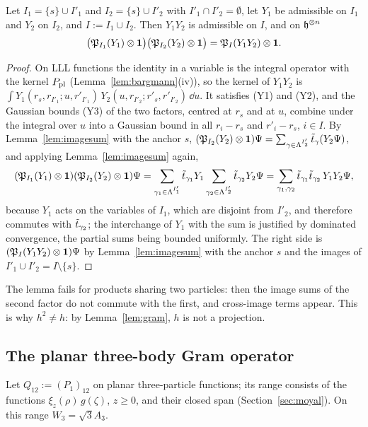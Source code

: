 \begin{lemma}\label{lem:product}
Let $I_1=\{s\}\cup I'_1$ and $I_2=\{s\}\cup I'_2$ with $I'_1\cap I'_2=\emptyset$, let $Y_1$ be admissible on $I_1$ and $Y_2$ on $I_2$, and
$I:=I_1\cup I_2$. Then $Y_1Y_2$ is admissible on $I$, and on $\mathfrak{h}^{\otimes n}$
\[
\bigl(\mathfrak{P}_{I_1}(Y_1)\otimes\mathbf{1}\bigr)\bigl(\mathfrak{P}_{I_2}(Y_2)\otimes\mathbf{1}\bigr)=\mathfrak{P}_I(Y_1Y_2)\otimes\mathbf{1} .
\]
\end{lemma}

\begin{proof}
On LLL functions the identity in a variable is the integral operator with the kernel $P_{\mathrm{pl}}$ (Lemma~\ref{lem:bargmann}(iv)), so the
kernel of $Y_1Y_2$ is $\int Y_1(r_s,r_{I'_1};u,r'_{I'_1})\,Y_2(u,r_{I'_2};r'_s,r'_{I'_2})\,\dd u$. It satisfies (Y1) and (Y2), and the Gaussian
bounds (Y3) of the two factors, centred at $r_s$ and at $u$, combine under the integral over $u$ into a Gaussian bound in all
$r_i-r_s$ and $r'_i-r_s$, $i\in I$. By Lemma~\ref{lem:imagesum} with the anchor $s$,
$(\mathfrak{P}_{I_2}(Y_2)\otimes\mathbf{1})\Psi=\sum_{\gamma\in\Lambda^{I'_2}}\tilde t_\gamma(Y_2\Psi)$, and applying Lemma~\ref{lem:imagesum} again,
\[
(\mathfrak{P}_{I_1}(Y_1)\otimes\mathbf{1})(\mathfrak{P}_{I_2}(Y_2)\otimes\mathbf{1})\Psi=\sum_{\gamma_1\in\Lambda^{I'_1}}\tilde t_{\gamma_1}Y_1\sum_{\gamma_2\in\Lambda^{I'_2}}\tilde t_{\gamma_2}Y_2\Psi
=\sum_{\gamma_1,\gamma_2}\tilde t_{\gamma_1}\tilde t_{\gamma_2}\,Y_1Y_2\Psi,
\]
because $Y_1$ acts on the variables of $I_1$, which are disjoint from $I'_2$, and therefore commutes with $\tilde t_{\gamma_2}$; the
interchange of $Y_1$ with the sum is justified by dominated convergence, the partial sums being bounded uniformly. The right
side is $(\mathfrak{P}_I(Y_1Y_2)\otimes\mathbf{1})\Psi$ by Lemma~\ref{lem:imagesum} with the anchor $s$ and the images of $I'_1\cup I'_2=I\setminus\{s\}$.
\end{proof}

The lemma fails for products sharing two particles: then the image sums of the second factor do not commute with the first,
and cross-image terms appear. This is why $h^2\neq h$: by Lemma~\ref{lem:gram}, $h$ is not a projection.

\subsection{The planar three-body Gram operator}

Let $Q_{12}:=(P_1)_{12}$ on planar three-particle functions; its range consists of the functions $\xi_z(\rho)\,g(\zeta)$, $z\ge0$,
and their closed span (Section~\ref{sec:moyal}). On this range $W_3=\sqrt3A_3$.

